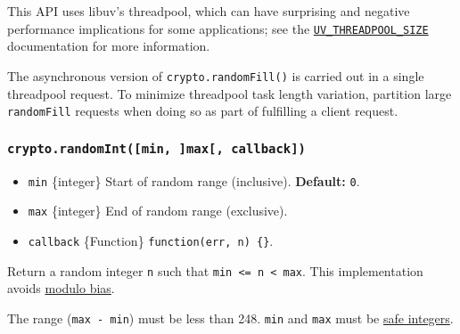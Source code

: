 \begin{Shaded}
\begin{Highlighting}[]
\OperatorTok{=}  \NormalTok{(}\NormalTok{)}\OperatorTok{;}
\OperatorTok{,}\OperatorTok{,}\KeywordTok{=\textgreater{}}\NormalTok{ \{}
  \OperatorTok{;}
  \NormalTok{(}\NormalTok{(}\NormalTok{))}\OperatorTok{;}
\NormalTok{\})}\OperatorTok{;}
\end{Highlighting}
\end{Shaded}

This API uses libuv's threadpool, which can have surprising and negative
performance implications for some applications; see the
\href{cli.md\#uv_threadpool_sizesize}{\texttt{UV\_THREADPOOL\_SIZE}}
documentation for more information.

The asynchronous version of \texttt{crypto.randomFill()} is carried out
in a single threadpool request. To minimize threadpool task length
variation, partition large \texttt{randomFill} requests when doing so as
part of fulfilling a client request.

\subsubsection{\texorpdfstring{\texttt{crypto.randomInt({[}min,\ {]}max{[},\ callback{]})}}{crypto.randomInt({[}min, {]}max{[}, callback{]})}}\label{crypto.randomintmin-max-callback}

\begin{itemize}
\tightlist
\item
  \texttt{min} \{integer\} Start of random range (inclusive).
  \textbf{Default:} \texttt{0}.
\item
  \texttt{max} \{integer\} End of random range (exclusive).
\item
  \texttt{callback} \{Function\} \texttt{function(err,\ n)\ \{\}}.
\end{itemize}

Return a random integer \texttt{n} such that
\texttt{min\ \textless{}=\ n\ \textless{}\ max}. This implementation
avoids
\href{https://en.wikipedia.org/wiki/Fisher\%E2\%80\%93Yates_shuffle\#Modulo_bias}{modulo
bias}.

The range (\texttt{max\ -\ min}) must be less than 248. \texttt{min} and
\texttt{max} must be
\href{https://developer.mozilla.org/en-US/docs/Web/JavaScript/Reference/Global_Objects/Number/isSafeInteger}{safe
integers}.

